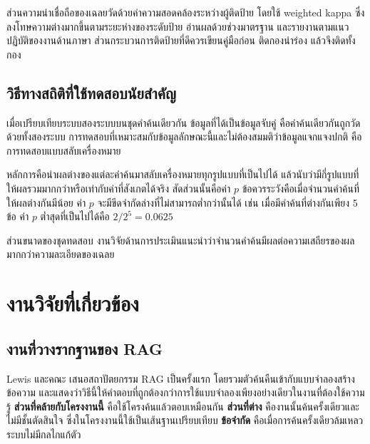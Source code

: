 ส่วนความน่าเชื่อถือของเฉลยวัดด้วยค่าความสอดคล้องระหว่างผู้ติดป้าย โดยใช้ weighted kappa \cite{cohen1968kappa} ซึ่งลงโทษความต่างมากขึ้นตามระยะห่างของระดับป้าย อ่านผลด้วยช่วงมาตรฐาน \cite{landis1977agreement} และรายงานตามแนวปฏิบัติของงานด้านภาษา \cite{artstein2008agreement} ส่วนกระบวนการติดป้ายที่ดีควรเขียนคู่มือก่อน ติดกองนำร่อง แล้วจึงติดทั้งกอง \cite{pustejovsky2012annotation}

\subsection{วิธีทางสถิติที่ใช้ทดสอบนัยสำคัญ}

เมื่อเปรียบเทียบระบบสองระบบบนชุดคำค้นเดียวกัน ข้อมูลที่ได้เป็นข้อมูลจับคู่ คือคำค้นเดียวกันถูกวัดด้วยทั้งสองระบบ การทดสอบที่เหมาะสมกับข้อมูลลักษณะนี้และไม่ต้องสมมติว่าข้อมูลแจกแจงปกติ คือการทดสอบแบบสลับเครื่องหมาย \cite{smucker2007comparison}

หลักการคือนำผลต่างของแต่ละคำค้นมาสลับเครื่องหมายทุกรูปแบบที่เป็นไปได้ แล้วนับว่ามีกี่รูปแบบที่ให้ผลรวมมากกว่าหรือเท่ากับค่าที่สังเกตได้จริง สัดส่วนนั้นคือค่า $p$ ข้อควรระวังคือเมื่อจำนวนคำค้นที่ให้ผลต่างกันมีน้อย ค่า $p$ จะมีขีดจำกัดล่างที่ไม่สามารถต่ำกว่านั้นได้ เช่น เมื่อมีคำค้นที่ต่างกันเพียง 5 ข้อ ค่า $p$ ต่ำสุดที่เป็นไปได้คือ $2/2^5 = 0.0625$

ส่วนขนาดของชุดทดสอบ งานวิจัยด้านการประเมินแนะนำว่าจำนวนคำค้นมีผลต่อความเสถียรของผลมากกว่าความละเอียดของเฉลย \cite{buckley2000stability, voorhees2000variations}

\section{งานวิจัยที่เกี่ยวข้อง}

\subsection{งานที่วางรากฐานของ RAG}

Lewis และคณะ \cite{lewis2020rag} เสนอสถาปัตยกรรม RAG เป็นครั้งแรก โดยรวมตัวค้นคืนเข้ากับแบบจำลองสร้างข้อความ และแสดงว่าวิธีนี้ให้คำตอบที่ถูกต้องกว่าการใช้แบบจำลองเพียงอย่างเดียวในงานที่ต้องใช้ความรู้ \textbf{ส่วนที่คล้ายกับโครงงานนี้} คือใช้โครงค้นแล้วตอบเหมือนกัน \textbf{ส่วนที่ต่าง} คืองานนั้นค้นครั้งเดียวและไม่มีชั้นตัดสินใจ ซึ่งในโครงงานนี้ใช้เป็นเส้นฐานเปรียบเทียบ \textbf{ข้อจำกัด} คือเมื่อการค้นครั้งเดียวล้มเหลว ระบบไม่มีกลไกแก้ตัว

